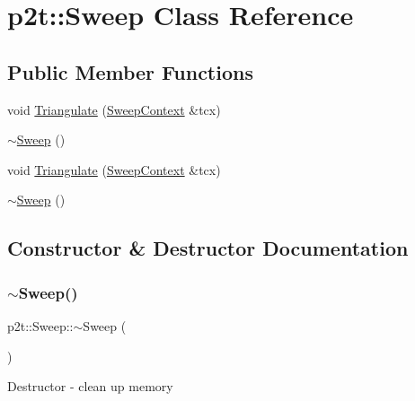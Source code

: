 \hypertarget{classp2t_1_1Sweep}{}\section{p2t\+:\+:Sweep Class Reference}
\label{classp2t_1_1Sweep}
\subsection*{Public Member Functions}
\begin{DoxyCompactItemize}
\item 
void \hyperlink{classp2t_1_1Sweep_a1b7060836f00801c4dbb0a529d78628a}{Triangulate} (\hyperlink{classp2t_1_1SweepContext}{Sweep\+Context} \&tcx)
\item 
\hyperlink{classp2t_1_1Sweep_a2b271def7a18df2324464fed9af1e1e7}{$\sim$\+Sweep} ()
\item 
void \hyperlink{classp2t_1_1Sweep_a1b7060836f00801c4dbb0a529d78628a}{Triangulate} (\hyperlink{classp2t_1_1SweepContext}{Sweep\+Context} \&tcx)
\item 
\hyperlink{classp2t_1_1Sweep_a2b271def7a18df2324464fed9af1e1e7}{$\sim$\+Sweep} ()
\end{DoxyCompactItemize}


\subsection{Constructor \& Destructor Documentation}
\mbox{\label{classp2t_1_1Sweep_a2b271def7a18df2324464fed9af1e1e7}} 
\subsubsection{\texorpdfstring{$\sim$\+Sweep()}{~Sweep()}\hspace{0.1cm}{\footnotesize\ttfamily [1/2]}}
{\footnotesize\ttfamily p2t\+::\+Sweep\+::$\sim$\+Sweep (\begin{DoxyParamCaption}{ }\end{DoxyParamCaption})}

Destructor -\/ clean up memory \mbox{\label{classp2t_1_1Sweep_a2b271def7a18df2324464fed9af1e1e7}} 
